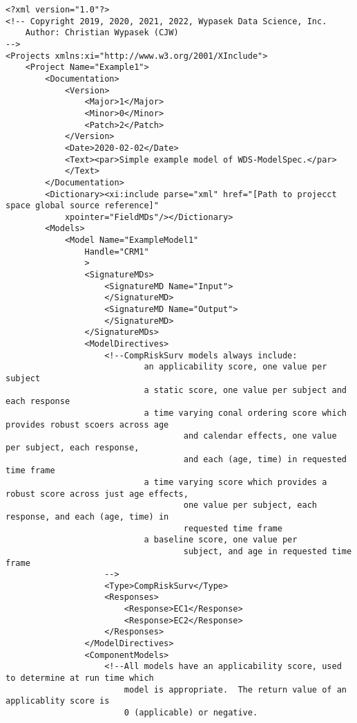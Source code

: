 \documentclass[10pt]{article}
\begin{document}
\begin{Verbatim}[fontsize=\small,baselinestretch=0.75,formatcom=\color{red}]
<?xml version="1.0"?>
<!-- Copyright 2019, 2020, 2021, 2022, Wypasek Data Science, Inc.
    Author: Christian Wypasek (CJW)
-->
<Projects xmlns:xi="http://www.w3.org/2001/XInclude">
    <Project Name="Example1">
        <Documentation>
            <Version>
                <Major>1</Major>
                <Minor>0</Minor>
                <Patch>2</Patch>
            </Version>
            <Date>2020-02-02</Date>
            <Text><par>Simple example model of WDS-ModelSpec.</par>
            </Text>
        </Documentation>
        <Dictionary><xi:include parse="xml" href="[Path to projecct space global source reference]"  
            xpointer="FieldMDs"/></Dictionary>
        <Models>
            <Model Name="ExampleModel1" 
                Handle="CRM1"
                >
                <SignatureMDs>
                    <SignatureMD Name="Input">
                    </SignatureMD>
                    <SignatureMD Name="Output">
                    </SignatureMD>
                </SignatureMDs>
                <ModelDirectives>
                    <!--CompRiskSurv models always include:
                            an applicability score, one value per subject
                            a static score, one value per subject and each response
                            a time varying conal ordering score which provides robust scoers across age 
                                    and calendar effects, one value per subject, each response, 
                                    and each (age, time) in requested time frame
                            a time varying score which provides a robust score across just age effects, 
                                    one value per subject, each response, and each (age, time) in 
                                    requested time frame
                            a baseline score, one value per
                                    subject, and age in requested time frame
                    -->
                    <Type>CompRiskSurv</Type>
                    <Responses>
                        <Response>EC1</Response>
                        <Response>EC2</Response>
                    </Responses>
                </ModelDirectives>
                <ComponentModels>
                    <!--All models have an applicability score, used to determine at run time which 
                        model is appropriate.  The return value of an applicablity score is 
                        0 (applicable) or negative.

\end{Verbatim}
\end{document}
